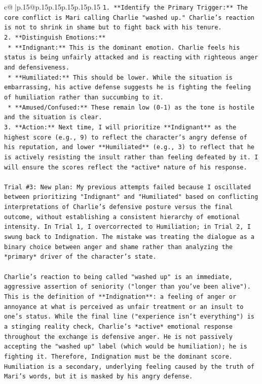 \documentclass{article}
\begin{document}
{\begin{supertabular}{c@{$\;$}|p{.15\linewidth}@{}p{.15\linewidth}p{.15\linewidth}p{.15\linewidth}p{.15\linewidth}p{.15\linewidth}}
{{{\texttt{1.  **Identify the Primary Trigger:** The core conflict is Mari calling Charlie "washed up." Charlie's reaction is not to shrink in shame but to fight back with his tenure.} \\
\texttt{2.  **Distinguish Emotions:**} \\
\texttt{    *   **Indignant:** This is the dominant emotion. Charlie feels his status is being unfairly attacked and is reacting with righteous anger and defensiveness.} \\
\texttt{    *   **Humiliated:** This should be lower. While the situation is embarrassing, his active defense suggests he is fighting the feeling of humiliation rather than succumbing to it.} \\
\texttt{    *   **Amused/Confused:** These remain low (0{-}1) as the tone is hostile and the situation is clear.} \\
\texttt{3.  **Action:** Next time, I will prioritize **Indignant** as the highest score (e.g., 9) to reflect the character's angry defense of his reputation, and lower **Humiliated** (e.g., 3) to reflect that he is actively resisting the insult rather than feeling defeated by it. I will ensure the scores reflect the *active* nature of his response.} \\
\\ 
\texttt{Trial \#3: New plan: My previous attempts failed because I oscillated between prioritizing "Indignant" and "Humiliated" based on conflicting interpretations of Charlie's defensive posture versus the final outcome, without establishing a consistent hierarchy of emotional intensity. In Trial 1, I overcorrected to Humiliation; in Trial 2, I swung back to Indignation. The mistake was treating the dialogue as a binary choice between anger and shame rather than analyzing the *primary* driver of the character's state.} \\
\\ 
\texttt{Charlie's reaction to being called "washed up" is an immediate, aggressive assertion of seniority ("longer than you've been alive"). This is the definition of **Indignation**: a feeling of anger or annoyance at what is perceived as unfair treatment or an insult to one's status. While the final line ("experience isn't everything") is a stinging reality check, Charlie's *active* emotional response throughout the exchange is defensive anger. He is not passively accepting the "washed up" label (which would be humiliation); he is fighting it. Therefore, Indignation must be the dominant score. Humiliation is a secondary, underlying feeling caused by the truth of Mari's words, but it is masked by his angry defense.} \\
}}}
\end{supertabular}}
\end{document}
